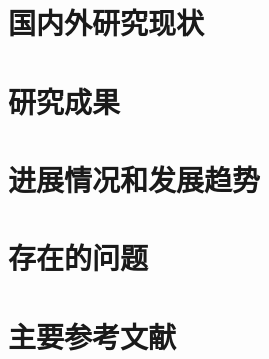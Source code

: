 \section{国内外研究现状}
    
\lipsum[1]\cite{Bohan1928,chen1980zhongguo}

\section{研究成果}

\lipsum[2-4]\cite{chen2005zhulu,chu2004tushu,yuan2012lanc}

\section{进展情况和发展趋势}

\lipsum[5-7]\cite{lamport1986document,niu2013zonghe}

\section{存在的问题}

\lipsum[8-11]\cite{wikibook2014latex,Dubrovin1906,hls2012jinji}

\section{主要参考文献}

